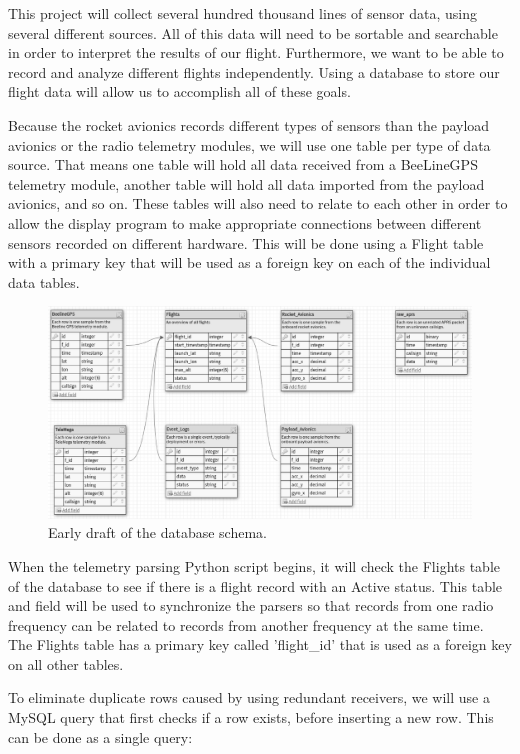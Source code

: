 \documentclass[onecolumn, draftclsnofoot, 10pt, compsoc]{IEEEtran}
\begin{document}
This project will collect several hundred thousand lines of sensor data, using several different sources.  All of this data will need to be sortable and searchable in order to interpret the results of our flight.  Furthermore, we want to be able to record and analyze different flights independently.  Using a database to store our flight data will allow us to accomplish all of these goals.

Because the rocket avionics records different types of sensors than the payload avionics or the radio telemetry modules, we will use one table per type of data source.  That means one table will hold all data received from a BeeLineGPS telemetry module, another table will hold all data imported from the payload avionics, and so on.  These tables will also need to relate to each other in order to allow the display program to make appropriate connections between different sensors recorded on different hardware.  This will be done using a Flight table with a primary key that will be used as a foreign key on each of the individual data tables.

\begin{figure}[h]
	\centering
	\includegraphics[width=\textwidth]{images/database.eps}
    \caption{Early draft of the database schema.}
\end{figure}

When the telemetry parsing Python script begins, it will check the Flights table of the database to see if there is a flight record with an Active status.  This table and field will be used to synchronize the parsers so that records from one radio frequency can be related to records from another frequency at the same time.  The Flights table has a primary key called 'flight\_id' that is used as a foreign key on all other tables.

To eliminate duplicate rows caused by using redundant receivers, we will use a MySQL query that first checks if a row exists, before inserting a new row.  This can be done as a single query: \cite{unique-sql-insert}
\end{document}
